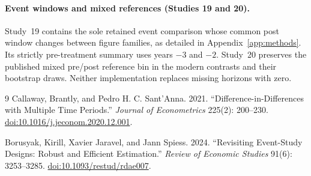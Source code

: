 \documentclass[11pt,letterpaper]{article}
\begin{document}
\paragraph{Event windows and mixed references (Studies 19 and 20).}
Study~19 contains the sole retained event comparison whose common post window changes between figure families, as detailed in Appendix~\ref{app:methods}. Its strictly pre-treatment summary uses years $-3$ and $-2$. Study~20 preserves the published mixed pre/post reference bin in the modern contrasts and their bootstrap draws. Neither implementation replaces missing horizons with zero. 


\begin{thebibliography}{9}
Callaway, Brantly, and Pedro H. C. Sant'Anna. 2021.
``Difference-in-Differences with Multiple Time Periods.''
\emph{Journal of Econometrics} 225(2): 200--230.
\href{https://doi.org/10.1016/j.jeconom.2020.12.001}{doi:10.1016/j.jeconom.2020.12.001}.

Borusyak, Kirill, Xavier Jaravel, and Jann Spiess. 2024.
``Revisiting Event-Study Designs: Robust and Efficient Estimation.''
\emph{Review of Economic Studies} 91(6): 3253--3285.
\href{https://doi.org/10.1093/restud/rdae007}{doi:10.1093/restud/rdae007}.
\end{thebibliography}
\end{document}
